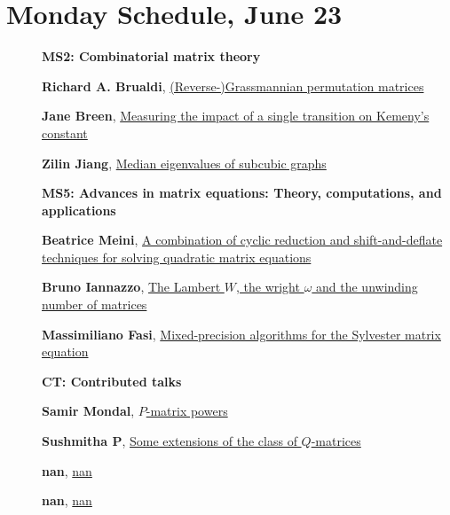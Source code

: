 \documentclass[ILAS2025-program.tex]{subfiles}
\begin{document}
\section*{Monday Schedule, June 23 }
        
        \begin{description}
    \item[] {\color{mstitle}\textbf{MS2: Combinatorial matrix theory}} 
    \item[] \hypertarget{up0031}{}\textbf{Richard A. Brualdi}, \hyperlink{down0031}{(Reverse-)Grassmannian permutation matrices}
        \item[] \hypertarget{up0032}{}\textbf{Jane Breen}, \hyperlink{down0032}{Measuring the impact of a single transition on Kemeny's constant
}
        \item[] \hypertarget{up0033}{}\textbf{Zilin Jiang}, \hyperlink{down0033}{Median eigenvalues of subcubic graphs}
        \end{description}
    \begin{description}
    \item[] {\color{mstitle}\textbf{MS5: Advances in matrix equations: Theory, computations, and applications}} 
    \item[] \hypertarget{up0064}{}\textbf{Beatrice Meini}, \hyperlink{down0064}{A combination of cyclic reduction and shift-and-deflate techniques for solving quadratic matrix equations
}
        \item[] \hypertarget{up0065}{}\textbf{Bruno Iannazzo}, \hyperlink{down0065}{The Lambert $W$, the wright $\omega$ and the unwinding number of matrices
}
        \item[] \hypertarget{up0066}{}\textbf{Massimiliano Fasi}, \hyperlink{down0066}{Mixed-precision algorithms for the Sylvester matrix equation}
        \end{description}
    \begin{description}
    \item[] {\color{mstitle}\textbf{CT: Contributed talks}} 
    \item[] \hypertarget{up0104}{}\textbf{Samir Mondal}, \hyperlink{down0104}{$P$-matrix powers}
        \item[] \hypertarget{up0105}{}\textbf{Sushmitha P}, \hyperlink{down0105}{Some extensions of the class of $Q$-matrices}
        \item[] \hypertarget{up0106}{}\textbf{nan}, \hyperlink{down0106}{nan}
        \item[] \hypertarget{up0107}{}\textbf{nan}, \hyperlink{down0107}{nan}
        \end{description}
    \newpage
\end{document}
